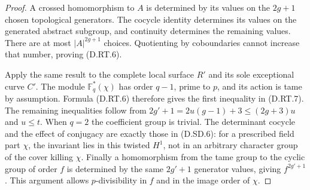 \begin{proof}
A crossed homomorphism to $A$ is determined by its values
on the $2g+1$ chosen topological generators. The cocycle
identity determines its values on the generated abstract
subgroup, and continuity determines the remaining values.
There are at most $|A|^{2g+1}$ choices. Quotienting by
coboundaries cannot increase that number, proving
(D.RT.6).

Apply the same result to the complete local surface $R'$
and its sole exceptional curve $C'$. The module
$\mathbb F_q^*(\chi)$ has order $q-1$, prime to $p$,
and its action is tame by assumption. Formula (D.RT.6)
therefore gives the first inequality in (D.RT.7). The
remaining inequalities follow from
$2g'+1=2u(g-1)+3\leq(2g+3)u$ and $u\leq t$.
When $q=2$ the coefficient group is trivial. The
determinant cocycle and the effect of conjugacy are
exactly those in (D.SD.6): for a prescribed field part
$\chi$, the invariant lies in this twisted $H^1$, not
in an arbitrary character group of the cover killing
$\chi$. Finally a homomorphism from the tame group to
the cyclic group of order $f$ is determined by the same
$2g'+1$ generator values, giving $f^{2g'+1}$. This
argument allows $p$-divisibility in $f$ and in the image
order of $\chi$.
\end{proof}
